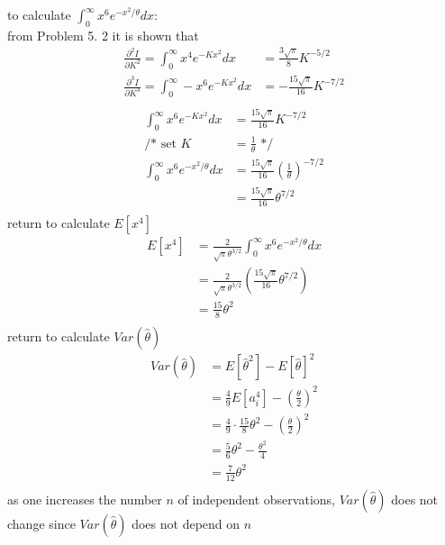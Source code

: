 \documentclass[12pt,border=4pt,multi]{article} %
\begin{document}
to calculate $\int_0^{\infty} x^6 e^{-x^2 / \theta} dx$:\\
from Problem 5. 2 it is shown that 
\begin{align*}
\frac{\partial^2 I}{\partial K^2} = \int_0^{\infty} x^4 e^{-Kx^2} dx &= \frac{3\sqrt{\pi}}{8}K^{-5 / 2}\\
\frac{\partial^3 I}{\partial K^3} = \int_0^{\infty} -x^6 e^{-Kx^2} dx &= -\frac{15\sqrt{\pi}}{16}K^{-7 / 2}\\
\end{align*}
\begin{align*}
\int_0^{\infty} x^6 e^{-Kx^2} dx &= \frac{15\sqrt{\pi}}{16}K^{-7 / 2}\\
\text{/* set } K &= \frac{1}{\theta} \text{ */}\\
\int_0^{\infty} x^6 e^{-x^2 / \theta} dx &= \frac{15\sqrt{\pi}}{16}\left(\frac{1}{\theta}\right)^{-7 / 2}\\
&= \frac{15\sqrt{\pi}}{16}\theta^{7 / 2}\\
\end{align*}
return to calculate $E[x^4]$
\begin{align*}
E[x^4] &= \frac{2}{\sqrt{\pi}\theta^{3 / 2}} \int_0^{\infty} x^6 e^{-x^2 / \theta} dx\\
&= \frac{2}{\sqrt{\pi}\theta^{3 / 2}} \left(\frac{15\sqrt{\pi}}{16}\theta^{7 / 2}\right)\\
&= \frac{15}{8}\theta^2\\
\end{align*}
return to calculate $Var(\hat{\theta})$
\begin{align*}
Var(\hat{\theta}) &= E[\hat{\theta}^2] - E[\hat{\theta}]^2\\
&= \frac{4}{9}E\left[a_i^4\right] - \left(\frac{\theta}{2}\right)^2\\
&= \frac{4}{9}\cdot\frac{15}{8}\theta^2 - \left(\frac{\theta}{2}\right)^2\\
&= \frac{5}{6}\theta^2 - \frac{\theta^2}{4}\\
&= \boxed{\frac{7}{12}\theta^2}\\
\end{align*}
as one increases the number $n$ of independent observations, $Var(\hat{\theta})$ does not change since $Var(\hat{\theta})$ does not depend on $n$\\
\end{document}

